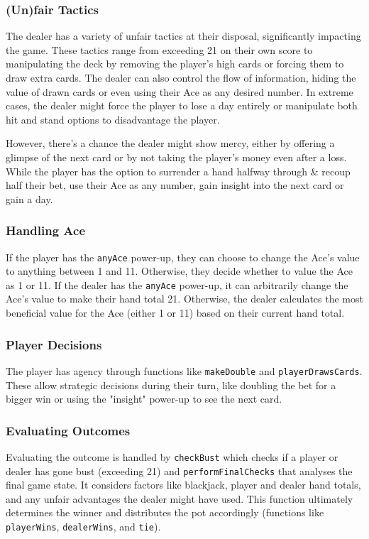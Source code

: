 \documentclass[9pt,a4paper,twoside]{tau-class/tau}
\begin{document}
    \subsubsection{(Un)fair Tactics}
    The dealer has a variety of unfair tactics at their disposal, significantly impacting the game. These tactics range from exceeding 21 on their own score to manipulating the deck by removing the player's high cards or forcing them to draw extra cards. The dealer can also control the flow of information, hiding the value of drawn cards or even using their Ace as any desired number. In extreme cases, the dealer might force the player to lose a day entirely or manipulate both hit and stand options to disadvantage the player. 
    
    However, there's a chance the dealer might show mercy, either by offering a glimpse of the next card or by not taking the player's money even after a loss. While the player has the option to surrender a hand halfway through \& recoup half their bet, use their Ace as any number, gain insight into the next card or gain a day.  
    
    \subsubsection{Handling Ace}   
    If the player has the \texttt{anyAce} power-up, they can choose to change the Ace's value to anything between 1 and 11. Otherwise, they decide whether to value the Ace as 1 or 11. If the dealer has the \texttt{anyAce} power-up, it can arbitrarily change the Ace's value to make their hand total 21. Otherwise, the dealer calculates the most beneficial value for the Ace (either 1 or 11) based on their current hand total. 
    
    \subsubsection{Player Decisions} 
    The player has agency through functions like \texttt{makeDouble} and \texttt{playerDrawsCards}. These allow strategic decisions during their turn, like doubling the bet for a bigger win or using the "insight" power-up to see the next card.  
    
    \subsubsection{Evaluating Outcomes} 
    Evaluating the outcome is handled by \texttt{checkBust} which checks if a player or dealer has gone bust (exceeding 21) and \texttt{performFinalChecks} that analyses the final game state. It considers factors like blackjack, player and dealer hand totals, and any unfair advantages the dealer might have used. This function ultimately determines the winner and distributes the pot accordingly (functions like \texttt{playerWins}, \texttt{dealerWins}, and \texttt{tie}). 
    
\end{document}
